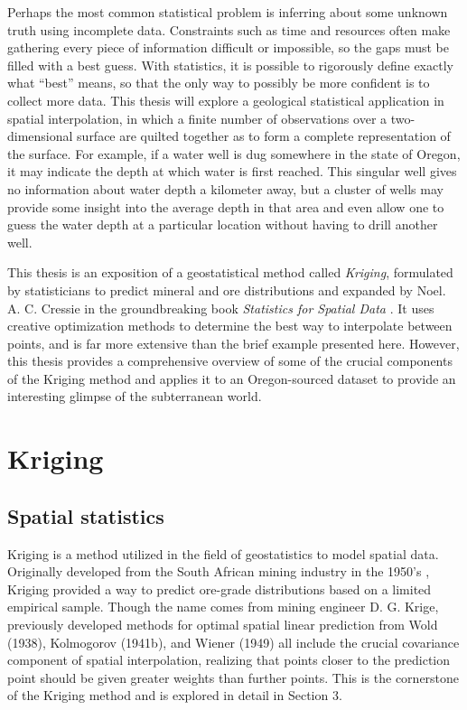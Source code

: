 \documentclass[12pt,twoside]{reedthesis}
\begin{document}
Perhaps the most common statistical problem is inferring about some unknown truth using incomplete data. Constraints such as time and resources often make gathering every piece of information difficult or impossible, so the gaps must be filled with a best guess. With statistics, it is possible to rigorously define exactly what ``best'' means, so that the only way to possibly be more confident is to collect more data. This thesis will explore a geological statistical application in spatial interpolation, in which a finite number of observations over a two-dimensional surface are quilted together as to form a complete representation of the surface. For example, if a water well is dug somewhere in the state of Oregon, it may indicate the depth at which water is first reached. This singular well gives no information about water depth a kilometer away, but a cluster of wells may provide some insight into the average depth in that area and even allow one to guess the water depth at a particular location without having to drill another well. 

This thesis is an exposition of a geostatistical method called \emph{Kriging}, formulated by statisticians to predict mineral and ore distributions and expanded by Noel. A. C. Cressie in the groundbreaking book \emph{Statistics for Spatial Data} \cite{cressie:1993}. It uses creative optimization methods to determine the best way to interpolate between points, and is far more extensive than the brief example presented here. However, this thesis provides a comprehensive overview of some of the crucial components of the Kriging method and applies it to an Oregon-sourced dataset to provide an interesting glimpse of the subterranean world. 
	
	

	
	
	
    \chapter{Kriging}
    	\section{Spatial statistics}
Kriging is a method utilized in the field of geostatistics to model spatial data. Originally developed from the South African mining industry in the 1950's \cite{cressie:1993}, Kriging provided a way to predict ore-grade distributions based on a limited empirical sample. Though the name comes from mining engineer D. G. Krige, previously developed methods for optimal spatial linear prediction from Wold (1938), Kolmogorov (1941b), and Wiener (1949) all include the crucial covariance component of spatial interpolation, realizing that points closer to the prediction point should be given greater weights than further points. This is the cornerstone of the Kriging method and is explored in detail in Section 3. 
\end{document}
